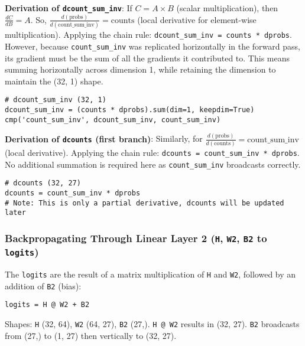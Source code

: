 \textbf{Derivation of \texttt{dcount\_sum\_inv}}:
If $C = A \times B$ (scalar multiplication), then $\frac{dC}{dB} = A$. So, $\frac{d(\text{probs})}{d(\text{count\_sum\_inv})} = \text{counts}$ (local derivative for element-wise multiplication).
Applying the chain rule: \texttt{dcount\_sum\_inv = counts * dprobs}.
However, because \texttt{count\_sum\_inv} was replicated horizontally in the forward pass, its gradient must be the sum of all the gradients it contributed to. This means summing horizontally across dimension 1, while retaining the dimension to maintain the (32, 1) shape.

\begin{lstlisting}[caption={Calculating dcount\_sum\_inv}]
# dcount_sum_inv (32, 1)
dcount_sum_inv = (counts * dprobs).sum(dim=1, keepdim=True)
cmp('count_sum_inv', dcount_sum_inv, count_sum_inv)
\end{lstlisting}

\textbf{Derivation of \texttt{dcounts} (first branch)}:
Similarly, for $\frac{d(\text{probs})}{d(\text{counts})} = \text{count\_sum\_inv}$ (local derivative).
Applying the chain rule: \texttt{dcounts = count\_sum\_inv * dprobs}. No additional summation is required here as \texttt{count\_sum\_inv} broadcasts correctly.

\begin{lstlisting}[caption={Calculating dcounts (partial)}]
# dcounts (32, 27)
dcounts = count_sum_inv * dprobs
# Note: This is only a partial derivative, dcounts will be updated later
\end{lstlisting}

\subsubsection{Backpropagating Through Linear Layer 2 (\texttt{H}, \texttt{W2}, \texttt{B2} to \texttt{logits})}
The \texttt{logits} are the result of a matrix multiplication of \texttt{H} and \texttt{W2}, followed by an addition of \texttt{B2} (bias):
\begin{lstlisting}[caption={Linear Layer 2 Calculation}]
logits = H @ W2 + B2
\end{lstlisting}
Shapes: \texttt{H} (32, 64), \texttt{W2} (64, 27), \texttt{B2} (27,). \texttt{H @ W2} results in (32, 27). \texttt{B2} broadcasts from (27,) to (1, 27) then vertically to (32, 27).

